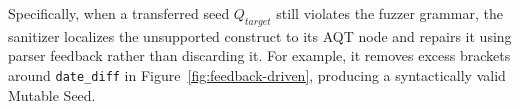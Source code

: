 \documentclass[conference]{IEEEtran}
\newcommand{\sedar}{\textsc{Sedar}\xspace}
\begin{document}
Specifically, when a transferred seed $Q_{target}$ still violates the fuzzer grammar, the sanitizer localizes the unsupported construct to its AQT node and repairs it using parser feedback rather than discarding it.
For example, it removes excess brackets around \texttt{date\_diff} in Figure~\ref{fig:feedback-driven}, producing a syntactically valid Mutable Seed.
\end{document}
